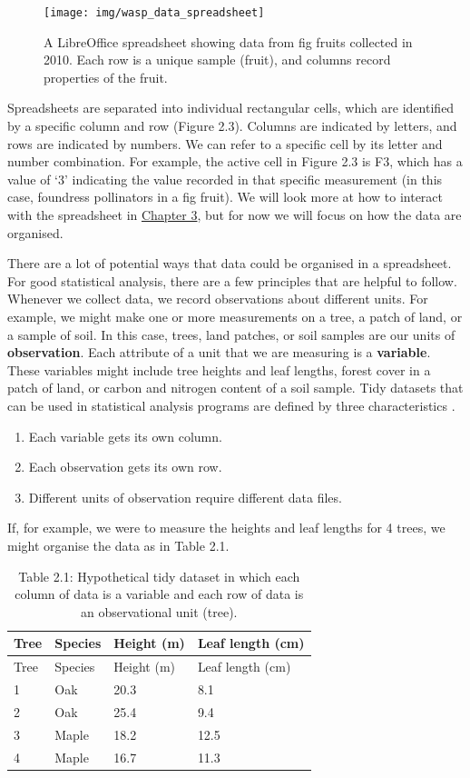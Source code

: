 \documentclass[
]{scrbook}
\providecommand{\tightlist}{%
  \setlength{\itemsep}{0pt}\setlength{\parskip}{0pt}}
\begin{document}
\begin{figure}
\texttt{[image: img/wasp\_data\_spreadsheet]} \caption{A LibreOffice spreadsheet showing data from fig fruits collected in 2010. Each row is a unique sample (fruit), and columns record properties of the fruit.}\label{fig:unnamed-chunk-5}
\end{figure}

Spreadsheets are separated into individual rectangular cells, which are identified by a specific column and row (Figure 2.3).
Columns are indicated by letters, and rows are indicated by numbers.
We can refer to a specific cell by its letter and number combination.
For example, the active cell in Figure 2.3 is F3, which has a value of `3' indicating the value recorded in that specific measurement (in this case, foundress pollinators in a fig fruit).
We will look more at how to interact with the spreadsheet in \protect\hyperlink{Chapter_3}{Chapter 3}, but for now we will focus on how the data are organised.

There are a lot of potential ways that data could be organised in a spreadsheet.
For good statistical analysis, there are a few principles that are helpful to follow.
Whenever we collect data, we record observations about different units.
For example, we might make one or more measurements on a tree, a patch of land, or a sample of soil.
In this case, trees, land patches, or soil samples are our units of \textbf{observation}.
Each attribute of a unit that we are measuring is a \textbf{variable}.
These variables might include tree heights and leaf lengths, forest cover in a patch of land, or carbon and nitrogen content of a soil sample.
Tidy datasets that can be used in statistical analysis programs are defined by three characteristics \citep{Wickham2014}.

\begin{enumerate}
\def\labelenumi{\arabic{enumi}.}
\tightlist
\item
  Each variable gets its own column.
\item
  Each observation gets its own row.
\item
  Different units of observation require different data files.
\end{enumerate}

If, for example, we were to measure the heights and leaf lengths for 4 trees, we might organise the data as in Table 2.1.

\begin{longtable}[]{@{}llll@{}}
\caption{Table 2.1: Hypothetical tidy dataset in which each column of data is a variable and each row of data is an observational unit (tree).}\tabularnewline
\toprule
Tree & Species & Height (m) & Leaf length (cm) \\
\midrule
\endfirsthead
\toprule
Tree & Species & Height (m) & Leaf length (cm) \\
\midrule
\endhead
1 & Oak & 20.3 & 8.1 \\
2 & Oak & 25.4 & 9.4 \\
3 & Maple & 18.2 & 12.5 \\
4 & Maple & 16.7 & 11.3 \\
\bottomrule
\end{longtable}
\end{document}
